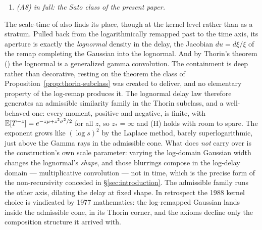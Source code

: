 \begin{remark}
\begin{enumerate}
different truncations must be kept apart here: the finite cascade of the \emph{published
construction}, whose time constants are fixed, is hypoexponential and not dilation-closed,
carrying only the ladder's discrete covariance (Remark~\ref{rem:covariance-practice});
truncating the \emph{exponent} instead --- finitely many atoms of the Thorin train, their
time constants moving with scale --- gives a family that is itself admissible and fully
covariant (Proposition~\ref{prop:thorin-subclass}), approximating the limit kernel from
inside the class. What is intrinsically discrete about it is the
cascade construction and the role of $q$ as the log-spacing of its Thorin atoms. Strict members of the middle stratum,
semi-selfdecomposable but not self-decomposable, exist and are natural --- geometric jump
ladders refining the Poisson scale space; the companion note constructs them and proves the
stratum's structure theorem.
\item \emph{(A8) in full: the Sato class of the present paper.}
\end{enumerate}

The scale-time of  also finds its place, though at the kernel
level rather than as a stratum. Pulled back from the logarithmically remapped past to the
time axis, its aperture is exactly the \emph{lognormal} density in the delay, the
Jacobian $du = d\xi/\xi$ of the remap completing the Gaussian into the lognormal. And
by Thorin's theorem () the lognormal is a generalized gamma
convolution. The containment is deep rather than decorative, resting on the theorem the
class of Proposition~\ref{prop:thorin-subclass} was created to deliver, and no elementary
property of the log-remap produces it. The lognormal delay law therefore generates an
admissible similarity family in the Thorin subclass, and a well-behaved one: every moment,
positive and negative, is finite, with $\mathbb{E}[T^{-z}] = e^{-z\mu + z^2\sigma^2/2}$ for all $z$,
so $z_* = \infty$ and (H) holds with room to spare. The exponent grows like
$(\log s)^2$ by the Laplace method, barely superlogarithmic, just above the Gamma rays in
the admissible cone. What does \emph{not} carry over is the construction's own scale
parameter: varying the log-domain Gaussian width changes the lognormal's \emph{shape}, and
those blurrings compose in the log-delay domain --- multiplicative convolution --- not in
time, which is the precise form of the non-recursivity conceded in
\S\ref{sec:introduction}. The admissible family runs the other axis, dilating the delay at
fixed shape. In retrospect the 1988 kernel choice is vindicated by 1977 mathematics: the
log-remapped Gaussian lands inside the admissible cone, in its Thorin corner, and the
axioms decline only the composition structure it arrived with.


\end{remark}
